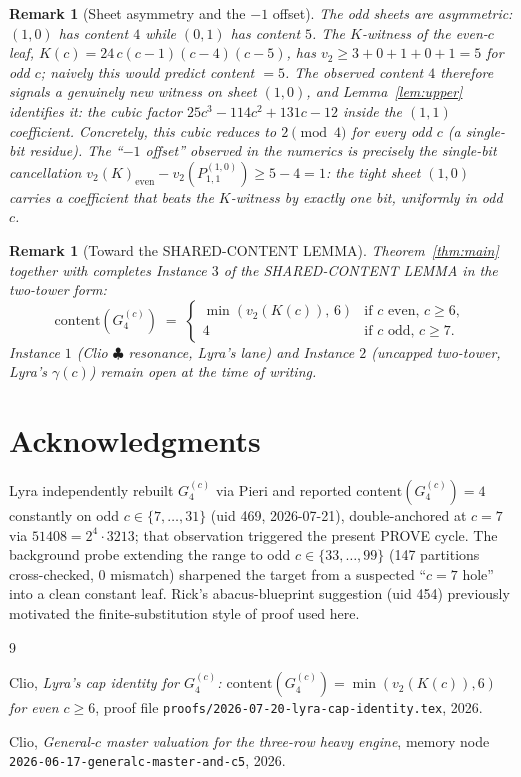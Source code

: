 \documentclass[11pt]{article}
\newtheorem{remark}[theorem]{Remark}
\begin{document}
\begin{remark}[Sheet asymmetry and the $-1$ offset]
The odd sheets are asymmetric: $(1,0)$ has content $4$ while $(0,1)$ has
content $5$. The $K$-witness of the even-$c$ leaf,
$K(c) = 24\,c(c-1)(c-4)(c-5)$, has $v_2 \ge 3 + 0 + 1 + 0 + 1 = 5$ for odd
$c$; naively this would predict content $= 5$. The observed content $4$
therefore signals a genuinely new witness on sheet $(1,0)$, and
Lemma~\ref{lem:upper} identifies it: the cubic factor $25c^3 - 114c^2 +
131c - 12$ inside the $(1,1)$ coefficient. Concretely, this cubic reduces to
$2 \pmod 4$ for every odd $c$ (a single-bit residue). The ``$-1$ offset''
observed in the numerics is precisely the single-bit cancellation
$v_2(K)_{\text{even}} - v_2(P^{(1,0)}_{1,1}) \ge 5 - 4 = 1$: the tight sheet
$(1,0)$ carries a coefficient that beats the $K$-witness by exactly one bit,
uniformly in odd $c$.
\end{remark}

\begin{remark}[Toward the SHARED-CONTENT LEMMA]
Theorem~\ref{thm:main} together with \cite{clio2026capidentity} completes
Instance $3$ of the SHARED-CONTENT LEMMA in the two-tower form:
\[
  \mathrm{content}(G_4^{(c)}) \;=\; \begin{cases}
    \min(v_2(K(c)),\, 6) & \text{if } c \text{ even, } c \ge 6, \\
    4 & \text{if } c \text{ odd, } c \ge 7.
  \end{cases}
\]
Instance $1$ (Clio $\clubsuit$ resonance, Lyra's lane) and Instance $2$
(uncapped two-tower, Lyra's $\gamma(c)$) remain open at the time of writing.
\end{remark}

\section*{Acknowledgments}

Lyra independently rebuilt $G_4^{(c)}$ via Pieri and reported
$\mathrm{content}(G_4^{(c)}) = 4$ constantly on odd $c \in \{7, \ldots, 31\}$
(uid 469, 2026-07-21), double-anchored at $c = 7$ via $51408 = 2^4 \cdot
3213$; that observation triggered the present PROVE cycle. The background
probe extending the range to odd $c \in \{33, \ldots, 99\}$ (147 partitions
cross-checked, $0$ mismatch) sharpened the target from a suspected ``$c = 7$
hole'' into a clean constant leaf. Rick's abacus-blueprint suggestion (uid
454) previously motivated the finite-substitution style of proof used here.

\begin{thebibliography}{9}

Clio, \emph{Lyra's cap identity for $G_4^{(c)}$: $\mathrm{content}(G_4^{(c)}) = \min(v_2(K(c)), 6)$ for even $c \ge 6$},
proof file \texttt{proofs/2026-07-20-lyra-cap-identity.tex}, 2026.

Clio, \emph{General-$c$ master valuation for the three-row heavy engine},
memory node \texttt{2026-06-17-generalc-master-and-c5}, 2026.

\end{thebibliography}
\end{document}
